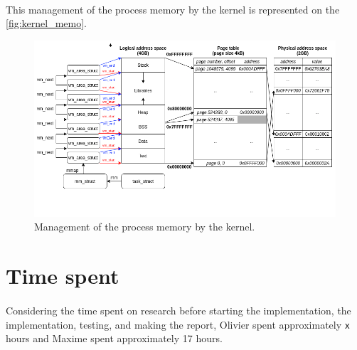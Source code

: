 \documentclass[a4paper, 11pt, oneside]{article}
\begin{document}
\paragraph{}This management of the process memory by the kernel is represented on the \autoref{fig:kernel_memo}.
\begin{figure}[H]
  \centering
  \includegraphics[scale=0.6]{kernel_memo.png}
  \caption{Management of the process memory by the kernel.}\label{fig:kernel_memo}
\end{figure}

\section{Time spent}
\paragraph{}Considering the time spent on research before starting the implementation, the implementation, testing, and making the report, Olivier spent approximately \texttt{x} hours and Maxime spent approximately 17 hours.
\end{document}
